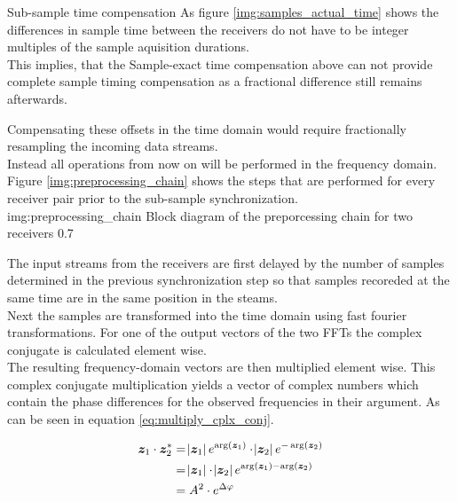 \begin{subchapter}{Sub-sample time compensation}
  As figure \ref{img:samples_actual_time} shows the
  differences in sample time between the receivers do not
  have to be integer multiples of the sample aquisition durations. \\

  This implies, that the Sample-exact time compensation above
  can not provide complete sample timing compensation as
  a fractional difference still remains afterwards.

  Compensating these offsets in the time domain would
  require fractionally resampling the incoming data streams. \\

  Instead all operations from now on will be performed
  in the frequency domain. Figure \ref{img:preprocessing_chain}
  shows the steps that are performed for every receiver pair prior to
  the sub-sample synchronization. \\

               {img:preprocessing_chain}
               {Block diagram of the preporcessing chain for two receivers}
               {0.7}

  The input streams from the receivers are first delayed
  by the number of samples determined in the previous
  synchronization step so that samples recoreded at the
  same time are in the same position in the steams. \\

  Next the samples are transformed into the time domain
  using fast fourier transformations.
  For one of the output vectors of the two FFTs the
  complex conjugate is calculated element wise. \\

  The resulting frequency-domain vectors are then
  multiplied element wise. This complex conjugate multiplication
  yields a vector of complex numbers which contain the
  phase differences for the observed frequencies in
  their argument. As can be seen in equation
  \ref{eq:multiply_cplx_conj}.

  \begin{equation}
    \label{eq:multiply_cplx_conj}
    \begin{split}
      \bm{z}_\text{1} \cdot \bm{z}_\text{2}^{\ast}
      & = \abs{\bm{z}_\text{1}} e^{\arg(\bm{z}_\text{1})}
        \cdot
        \abs{\bm{z}_\text{2}} e^{-\arg(\bm{z}_\text{2})} \\
      & = \abs{\bm{z}_\text{1}} \cdot \abs{\bm{z}_\text{2}}
        e^{\arg(\bm{z}_\text{1}) - \arg(\bm{z}_\text{2})} \\
      & = A^{2} \cdot e^{\Delta \varphi}
    \end{split}
  \end{equation}


\end{subchapter}
